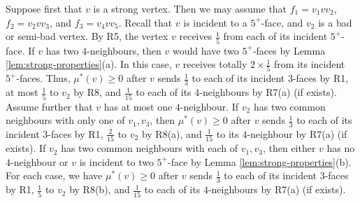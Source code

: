 \documentclass[12pt, reqno]{amsart}
\theoremstyle{plain}
\theoremstyle{definition}
\numberwithin{equation}{section}
\begin{document}
Suppose first that $v$ is a strong vertex. Then we may assume that $f_1=v_1vv_2$, $f_2=v_2vv_3$, and $f_3=v_4vv_5$.  Recall that $v$ is incident to a $5^+$-face, and $v_2$ is a bad or semi-bad vertex. By R5, the vertex $v$ receives $\frac{1}{5}$ from each of its incident $5^+$-face.
If $v$ has two $4$-neighbours, then $v$ would have two $5^+$-faces by Lemma \ref{lem:strong-properties}(a). %
In this case, $v$ receives totally $2\times \frac{1}{5}$ from its incident $5^+$-faces. Thus, $\mu^*(v)\geq 0$ after $v$ sends $\frac{1}{3}$ to each of its incident $3$-faces by R1, at most $\frac{1}{5}$ to $v_2$ by R8, and $\frac{1}{15}$ to each of its $4$-neighbours by R7(a) (if exists). 
Assume further that $v$ has at most one $4$-neighbour. 
If $v_2$ has two common neighbours with only one of $v_1,v_3$, then $\mu^*(v)\geq 0$ after $v$ sends $\frac{1}{3}$ to each of its incident $3$-faces by R1, $\frac{2}{15}$ to $v_2$ by R8(a), and $\frac{1}{15}$ to its $4$-neighbour by R7(a) (if exists). 
If $v_2$ has two common neighbours with each of $v_1,v_3$, then either $v$ has no $4$-neighbour or $v$ is incident to  two $5^+$-face by Lemma \ref{lem:strong-properties}(b). For each case, we have  $\mu^*(v)\geq 0$ after $v$ sends $\frac{1}{3}$ to each of its incident $3$-faces by R1, $\frac{1}{5}$ to $v_2$ by R8(b), and $\frac{1}{15}$ to each of its $4$-neighbours by R7(a) (if exists).  

\end{document}
